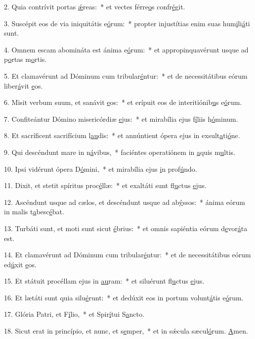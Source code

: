 2. Quia contrívit portas \uline{ǽ}reas:~* et vectes férre\uline{o}s confr\uline{é}git.\par 
3. Suscépit eos de via iniquitátis e\uline{ó}rum:~* propter injustítias enim suas hum\uline{i}li\uline{á}ti sunt.\par 
4. Omnem escam abomináta est ánima e\uline{ó}rum:~* et appropinquavérunt usque ad p\uline{o}rtas m\uline{o}rtis.\par 
5. Et clamavérunt ad Dóminum cum tribular\uline{é}ntur:~* et de necessitátibus eórum liber\uline{á}vit \uline{e}os.\par 
6. Misit verbum suum, et sanávit \uline{e}os:~* et erípuit eos de interitiónib\uline{u}s e\uline{ó}rum.\par 
7. Confiteántur Dómino misericórdiæ \uline{e}jus:~* et mirabília ejus f\uline{í}liis h\uline{ó}minum.\par 
8. Et sacríficent sacrifícium l\uline{au}dis:~* et annúntient ópera ejus in exsult\uline{a}ti\uline{ó}ne.\par 
9. Qui descéndunt mare in n\uline{á}vibus,~* faciéntes operatiónem in \uline{a}quis m\uline{u}ltis.\par 
10. Ipsi vidérunt ópera D\uline{ó}mini,~* et mirabília ejus \uline{i}n prof\uline{ú}ndo.\par 
11. Dixit, et stetit spíritus proc\uline{é}llæ:~* et exaltáti sunt fl\uline{u}ctus \uline{e}jus.\par 
12. Ascéndunt usque ad cælos, et descéndunt usque ad ab\uline{ý}ssos:~* ánima eórum in malis t\uline{a}besc\uline{é}bat.\par 
13. Turbáti sunt, et moti sunt sicut \uline{é}brius:~* et omnis sapiéntia eórum d\uline{e}vor\uline{á}ta est.\par 
14. Et clamavérunt ad Dóminum cum tribular\uline{é}ntur:~* et de necessitátibus eórum ed\uline{ú}xit \uline{e}os.\par 
15. Et státuit procéllam ejus in \uline{au}ram:~* et siluérunt fl\uline{u}ctus \uline{e}jus.\par 
16. Et lætáti sunt quia silu\uline{é}runt:~* et dedúxit eos in portum volunt\uline{á}tis e\uline{ó}rum.\par 
17. Glória Patri, et F\uline{í}lio,~* et Spir\uline{í}tui S\uline{a}ncto.\par 
18. Sicut erat in princípio, et nunc, et s\uline{e}mper,~* et in sǽcula sæcul\uline{ó}rum. \uline{A}men.\par 

